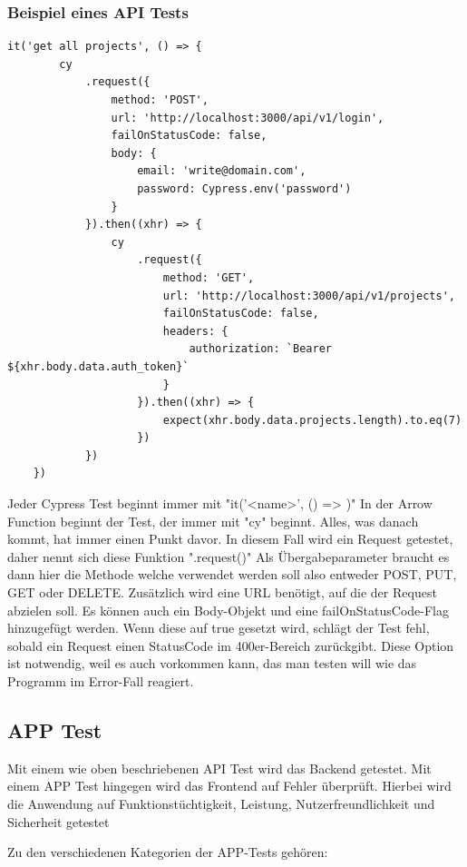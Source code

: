 \subsubsection{Beispiel eines API Tests}
\begin{lstlisting}[caption=API Test]
it('get all projects', () => {
        cy
            .request({
                method: 'POST',
                url: 'http://localhost:3000/api/v1/login',
                failOnStatusCode: false,
                body: {
                    email: 'write@domain.com',
                    password: Cypress.env('password')
                }
            }).then((xhr) => {
                cy
                    .request({
                        method: 'GET',
                        url: 'http://localhost:3000/api/v1/projects',
                        failOnStatusCode: false,
                        headers: {
                            authorization: `Bearer ${xhr.body.data.auth_token}`
                        }
                    }).then((xhr) => {
                        expect(xhr.body.data.projects.length).to.eq(7)
                    })
            })
    })
\end{lstlisting}

Jeder Cypress Test beginnt immer mit "it('<name>', () => {})" In der Arrow Function beginnt der Test, der immer mit "cy" beginnt. Alles, was danach kommt, hat immer einen Punkt davor. In diesem Fall wird ein Request getestet, daher nennt sich diese Funktion ".request({})" Als Übergabeparameter braucht es dann hier die Methode welche verwendet werden soll also entweder POST, PUT, GET oder DELETE. Zusätzlich wird eine URL benötigt, auf die der Request abzielen soll. Es können auch ein Body-Objekt und eine failOnStatusCode-Flag hinzugefügt werden. Wenn diese auf true gesetzt wird, schlägt der Test fehl, sobald ein Request einen StatusCode im 400er-Bereich zurückgibt. Diese Option ist notwendig, weil es auch vorkommen kann, das man testen will wie das Programm im Error-Fall reagiert.
\cite{API_Tests}
\subsection{APP Test}
Mit einem wie oben beschriebenen API Test wird das Backend getestet. Mit einem APP Test hingegen wird das Frontend auf Fehler überprüft. Hierbei wird die Anwendung auf Funktionstüchtigkeit, Leistung, Nutzerfreundlichkeit und Sicherheit getestet

Zu den verschiedenen Kategorien der APP-Tests gehören:

